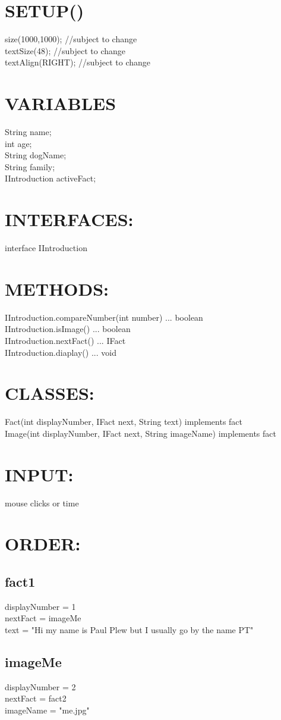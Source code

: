 \documentclass{article}
\begin{document}
    \section{SETUP()} size(1000,1000); //subject to change \\ textSize(48); //subject to change \\ textAlign(RIGHT); //subject to change
    \section{VARIABLES}String name; \\int age; \\String dogName; \\String family;\\IIntroduction activeFact;
    \section{INTERFACES:}interface IIntroduction {}
    \section{METHODS:}IIntroduction.compareNumber(int number) ... boolean \\ IIntroduction.isImage() ... boolean\\IIntroduction.nextFact() ... IFact\\IIntroduction.diaplay() ... void
    \section{CLASSES:}Fact(int displayNumber, IFact next, String text) implements fact \\Image(int displayNumber, IFact next, String imageName) implements fact
    \section{INPUT:} mouse clicks or time
    \section{ORDER:}
        \subsection{fact1}displayNumber = 1 \\nextFact = imageMe\\text = "Hi my name is Paul Plew but I usually go by the name PT"
        \subsection{imageMe}displayNumber = 2 \\nextFact = fact2\\imageName = "me.jpg"
\end{document}
